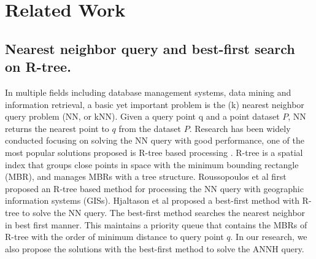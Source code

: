 \documentclass[a4paper,11pt]{report}
\theoremstyle{mytheoremstyle}
\begin{document}
\chapter{Related Work}
\label{section:related-works}

\section{Nearest neighbor query and best-first search on R-tree.}
In multiple fields including database management systems, data mining and information retrieval, a basic yet important problem is the (k) nearest neighbor query problem (NN, or kNN). Given a query point q and a point dataset $P$, NN returns the nearest point to $q$ from the dataset $P$. Research has been widely conducted focusing on solving the NN query with good performance, one of the most popular solutions proposed is R-tree based processing \cite{NN,cheung1998enhanced,hjaltason1999distance}. R-tree \cite{R-tree} is a spatial index that groups close points in space with the minimum bounding rectangle (MBR), and manages MBRs with a tree structure. Roussopoulos et al \cite{NN} first proposed an R-tree based method for processing the NN query with geographic information systems (GISs). Hjaltason et al \cite{hjaltason1999distance} proposed a best-first method with R-tree to solve the NN query. The best-first method searches the nearest neighbor in best first manner. This maintains a priority queue that contains the MBRs of R-tree with the order of minimum distance to query point $q$. In our research, we also propose the solutions with the best-first method to solve the ANNH query.
\end{document}
